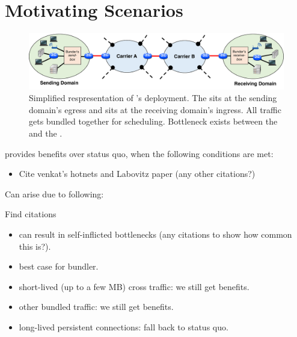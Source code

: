 \section{Motivating Scenarios}
\label{s:deploy}
\begin{figure}
    \centering
    \includegraphics[width=\textwidth]{img/deployment-arch.pdf}
    \caption{Simplified respresentation of \name's deployment. 
    The \inbox sits at the sending domain's egress and \outbox sits at the receiving domain's ingress. All traffic  gets bundled together for scheduling. Bottleneck exists between the \inbox and the \outbox.
    }\label{fig:deploy:arch}
\end{figure}


\name provides benefits over status quo, when the following conditions are met:

\begin{itemize}
    \item Cite venkat's hotnets and Labovitz paper (any other citations?)
\end{itemize}

Can arise due to following:

Find citations
\begin{itemize}
    \item can result in self-inflicted bottlenecks (any citations to show how common this is?).
    \item best case for bundler.
\end{itemize}

\begin{itemize}
    \item short-lived (up to a few MB) cross traffic: we still get benefits.
    \item other bundled traffic: we still get benefits.
    \item long-lived persistent connections: fall back to status quo.
\end{itemize}


\radhika{*/}